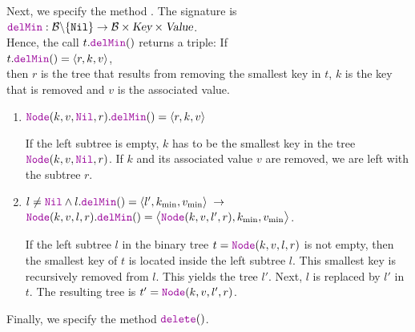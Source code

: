 Next, we specify the  method .  The signature is
\\[0.2cm]
\hspace*{1.3cm}
$\mytt{delMin}:\mathcal{B} \backslash \{ \mathtt{Nil} \} \rightarrow \mathcal{B} \times \textsl{Key} \times \textsl{Value}$.
\\[0.2cm]
Hence, the call $t.\mytt{delMin}()$ returns a triple: If 
\\[0.2cm]
\hspace*{1.3cm}
$t.\mytt{delMin}() = \langle r,k,v \rangle$,
\\[0.2cm]
then $r$ is the tree that  results from
removing the smallest key in $t$, $k$ is the key that is removed and $v$ is the associated value.
\begin{enumerate}
\item $\mytt{Node}(k, v, \mytt{Nil}, r).\mytt{delMin}() = \langle r, k, v\rangle$

      If the left subtree is empty, $k$ has to be the smallest key in the tree 
      $\mytt{Node}(k, v, \mytt{Nil}, r)$.  If $k$ and its associated value $v$ are removed, we are left with the subtree $r$.
\item $l\not= \mytt{Nil} \wedge l.\mytt{delMin}() = \langle l',k_{\textrm{min}}, v_{\textrm{min}}\rangle \;\rightarrow$ \\[0.2cm]
       \hspace*{1.3cm} 
       $\mytt{Node}(k, v, l, r).\mytt{delMin}() = \bigl\langle\mytt{Node}(k, v, l', r), k_{\textrm{min}}, v_{\textrm{min}}\bigr\rangle$.

      If the left subtree $l$ in the binary tree $t = \mytt{Node}(k, v, l, r)$
      is not empty, then the smallest key of  $t$ is located inside the left subtree $l$.
      This smallest key is recursively removed from  $l$. This yields the tree 
      $l'$.  Next,  $l$ is replaced by $l'$ in $t$.  The resulting tree is
      $t' = \mytt{Node}(k, v, l', r)$.
\end{enumerate}
Finally, we specify the method $\mytt{delete}()$.
